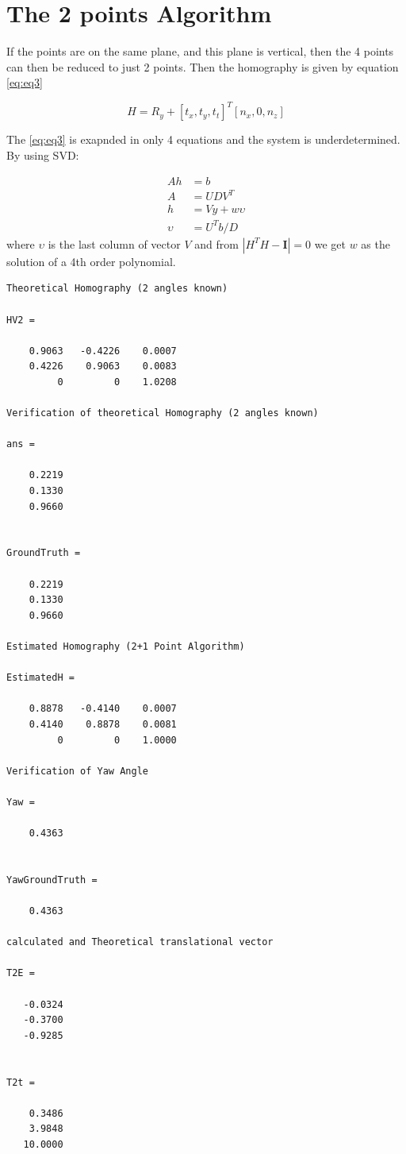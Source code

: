 \documentclass[a4paper,12pt]{article}
\begin{document}
\section{The 2 points Algorithm}
If the points are on the same plane, and this plane is vertical, then the 4 points can
then be reduced to just 2 points. Then the homography is given by equation \eqref{eq:eq3}

\begin{equation}
	H = R_y + [t_x,t_y,t_t]^T [n_x,0,n_z]
	\label{eq:eq3}
\end{equation}


\noindent The \eqref{eq:eq3} is exapnded in only 4 equations and the system is underdetermined. By using SVD:

\begin{align}
	A h &= b \\
	A &= U D V^T \\
	h &= Vy +w \upsilon \\
	\upsilon &= U^Tb / D
	\label{eq:eq4}
\end{align}
where $\upsilon$ is the last column of vector $V$ and from $\left| H^T H - \mathbf{I}\right| = 0$ we get $w$ as the solution of a 4th order polynomial.

\begin{verbatim}
Theoretical Homography (2 angles known)

HV2 =

    0.9063   -0.4226    0.0007
    0.4226    0.9063    0.0083
         0         0    1.0208

Verification of theoretical Homography (2 angles known)

ans =

    0.2219
    0.1330
    0.9660


GroundTruth =

    0.2219
    0.1330
    0.9660

Estimated Homography (2+1 Point Algorithm)

EstimatedH =

    0.8878   -0.4140    0.0007
    0.4140    0.8878    0.0081
         0         0    1.0000

Verification of Yaw Angle

Yaw =

    0.4363


YawGroundTruth =

    0.4363

calculated and Theoretical translational vector

T2E =

   -0.0324
   -0.3700
   -0.9285


T2t =

    0.3486
    3.9848
   10.0000
             
\end{verbatim}
\end{document}
